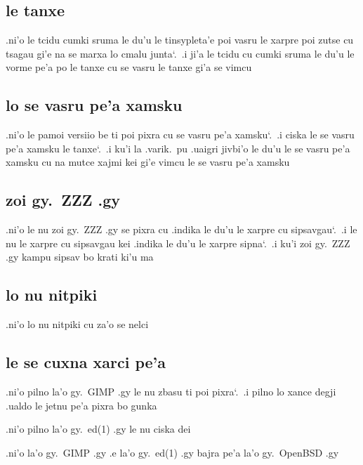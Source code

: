 \documentclass{report}
\newcommand\sds{\spacefactor\sfcode`.\ \space}
\begin{document}
\subsection{le tanxe}
.ni'o le tcidu cumki sruma le du'u le tinsypleta'e poi vasru le xarpre poi zutse cu tsagau gi'e na se marxa lo cmalu junta\sds  .i ji'a le tcidu cu cumki sruma le du'u le vorme pe'a po le tanxe cu se vasru le tanxe gi'a se vimcu

\subsection{lo se vasru pe'a xamsku}
.ni'o le pamoi versiio be ti poi pixra cu se vasru pe'a xamsku\sds  .i ciska le se vasru pe'a xamsku le tanxe\sds  .i ku'i la .varik.\ pu .uaigri jivbi'o le du'u le se vasru pe'a xamsku cu na mutce xajmi kei gi'e vimcu le se vasru pe'a xamsku

\subsection{zoi gy.\ ZZZ .gy}
.ni'o le nu zoi gy.\ ZZZ .gy se pixra cu .indika le du'u le xarpre cu sipsavgau\sds  .i le nu le xarpre cu sipsavgau kei .indika le du'u le xarpre sipna\sds  .i ku'i zoi gy.\ ZZZ .gy kampu sipsav bo krati ki'u ma

\subsection{lo nu nitpiki}
.ni'o lo nu nitpiki cu za'o se nelci

\subsection{le se cuxna xarci pe'a}
.ni'o pilno la'o gy.\ GIMP .gy le nu zbasu ti poi pixra\sds  .i pilno lo xance degji .ualdo le jetnu pe'a pixra bo gunka

.ni'o pilno la'o gy.\ ed(1) .gy le nu ciska dei

.ni'o la'o gy.\ GIMP .gy .e la'o gy.\ ed(1) .gy bajra pe'a la'o gy.\ OpenBSD .gy
\end{document}
